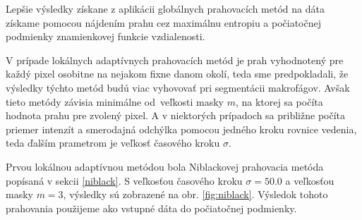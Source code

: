 \documentclass[a4paper,11pt,oneside]{article}%
\begin{document}
Lepšie výsledky získane z aplikácii globálnych prahovacích metód na dáta získame pomocou nájdením prahu cez maximálnu entropiu a počiatočnej podmienky znamienkovej funkcie vzdialenosti.

V prípade lokálnych adaptívnych prahovacích metód je prah vyhodnotený pre každý pixel osobitne na nejakom fixne danom okolí, teda sme predpokladali, že výsledky týchto metód budú viac vyhovovať pri segmentácii makrofágov. Avšak tieto metódy závisia minimálne od~veľkosti masky $m$, na ktorej sa počíta hodnota prahu pre zvolený pixel. A v niektorých prípadoch sa približne počíta priemer intenzít a smerodajná odchýlka pomocou jedného kroku rovnice vedenia, teda ďalším prametrom je veľkosť časového kroku $\sigma$. 

Prvou lokálnou adaptívnou metódou bola Niblackovej prahovacia metóda popísaná v sekcii \ref{niblack}.  S veľkosťou časového kroku $\sigma = 50.0$ a veľkosťou masky $m = 3$, výsledky sú zobrazené na obr. \ref{fig:niblack}. Výsledok tohoto prahovania použijeme ako vstupné dáta do počiatočnej podmienky.
\end{document}
